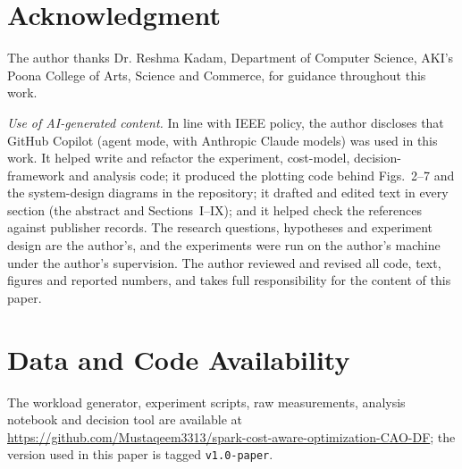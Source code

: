 \section*{Acknowledgment}
The author thanks Dr. Reshma Kadam, Department of Computer Science, AKI's Poona College of Arts, Science and Commerce, for guidance throughout this work.

\emph{Use of AI-generated content.} In line with IEEE policy, the author discloses that
GitHub Copilot (agent mode, with Anthropic Claude models) was used in this work. It helped
write and refactor the experiment, cost-model, decision-framework and analysis code; it
produced the plotting code behind Figs.~2--7 and the system-design diagrams in the
repository; it drafted and edited text in every section (the abstract and Sections~I--IX);
and it helped check the references against publisher records. The research questions,
hypotheses and experiment design are the author's, and the experiments were run on the
author's machine under the author's supervision. The author reviewed and revised all code,
text, figures and reported numbers, and takes full responsibility for the content of this
paper.

\section*{Data and Code Availability}
The workload generator, experiment scripts, raw measurements, analysis notebook and decision tool are available
at \url{https://github.com/Mustaqeem3313/spark-cost-aware-optimization-CAO-DF}; the version used in this paper is tagged \texttt{v1.0-paper}.
